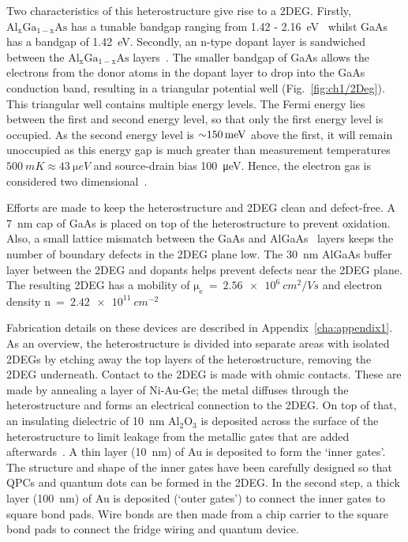 Two characteristics of this heterostructure give rise to a 2DEG. Firstly, $\mathrm{Al_xGa_{1-x}As}$ has a tunable bandgap ranging from 1.42 - \qty{2.16}{eV}~\cite{gaas_overview} whilst GaAs has a bandgap of \qty{1.42}{eV}. Secondly, an n-type dopant layer is sandwiched between the $\mathrm{Al_xGa_{1-x}As}$ layers~\cite{dopant_layer}. The smaller bandgap of GaAs allows the electrons from the donor atoms in the dopant layer to drop into the GaAs conduction band, resulting in a triangular potential well (Fig.~\ref{fig:ch1/2Deg}). This triangular well contains multiple energy levels. The Fermi energy lies between the first and second energy level, so that only the first energy level is occupied. As the second energy level is $\qty{\sim 150}{meV}$ above the first, it will remain unoccupied as this energy gap is much greater than measurement temperatures $\qty{500}{mK}\approx\qty{43}{\micro eV}$ and source-drain bias \qty{100}{\micro eV}. Hence, the electron gas is considered two dimensional~\cite{BEENAKKER_1991}.

Efforts are made to keep the heterostructure and 2DEG clean and defect-free. A \qty{7}{nm} cap of GaAs is placed on top of the heterostructure to prevent oxidation. Also, a small lattice mismatch between the GaAs and AlGaAs~\cite{gaas_superlattice} layers keeps the number of boundary defects in the 2DEG plane low. The \qty{30}{nm} AlGaAs buffer layer between the 2DEG and dopants helps prevent defects near the 2DEG plane. The resulting 2DEG has a mobility of $\mathrm{\mu_e}~=~\qty{2.56e6}{cm^2/Vs}$ and electron density $\mathrm{n}~=~\qty{2.42e11}{cm^{-2}}$

Fabrication details on these devices are described in Appendix~\ref{cha:appendix1}. As an overview, the heterostructure is divided into separate areas with isolated 2DEGs by etching away the top layers of the heterostructure, removing the 2DEG underneath. Contact to the 2DEG is made with ohmic contacts. These are made by annealing a layer of Ni-Au-Ge; the metal diffuses through the heterostructure and forms an electrical connection to the 2DEG. On top of that, an insulating dielectric of \qty{10}{nm} $\mathrm{Al_2O_3}$ is deposited across the surface of the heterostructure to limit leakage from the metallic gates that are added afterwards~\cite{insulating_gates}. A thin layer (\qty{10}{nm}) of Au is deposited to form the `inner gates'. The structure and shape of the inner gates have been carefully designed so that QPCs and quantum dots can be formed in the 2DEG. In the second step, a thick layer (\qty{100}{nm}) of Au is deposited (`outer gates') to connect the inner gates to square bond pads. Wire bonds are then made from a chip carrier to the square bond pads to connect the fridge wiring and quantum device. 




